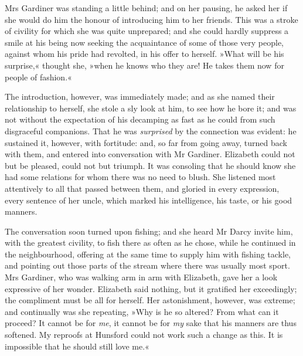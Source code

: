 Mrs Gardiner was standing a little behind; and on her pausing, he asked her if she would do him the honour of introducing him to her friends. This was a stroke of civility for which she was quite unprepared; and she could hardly suppress a smile at his being now seeking the acquaintance of some of those very people, against whom his pride had revolted, in his offer to herself. »What will be his surprise,« thought she, »when he knows who they are! He takes them now for people of fashion.«

The introduction, however, was immediately made; and as she named their relationship to herself, she stole a sly look at him, to see how he bore it; and was not without the expectation of his decamping as fast as he could from such disgraceful companions. That he was \textit{surprised} by the connection was evident: he sustained it, however, with fortitude: and, so far from going away, turned back with them, and entered into conversation with Mr Gardiner. Elizabeth could not but be pleased, could not but triumph. It was consoling that he should know she had some relations for whom there was no need to blush. She listened most attentively to all that passed between them, and gloried in every expression, every sentence of her uncle, which marked his intelligence, his taste, or his good manners.

The conversation soon turned upon fishing; and she heard Mr Darcy invite him, with the greatest civility, to fish there as often as he chose, while he continued in the neighbourhood, offering at the same time to supply him with fishing tackle, and pointing out those parts of the stream where there was usually most sport. Mrs Gardiner, who was walking arm in arm with Elizabeth, gave her a look expressive of her wonder. Elizabeth said nothing, but it gratified her exceedingly; the compliment must be all for herself. Her astonishment, however, was extreme; and continually was she repeating, »Why is he so altered? From what can it proceed? It cannot be for \textit{me}, it cannot be for \textit{my} sake that his manners are thus softened. My reproofs at Hunsford could not work such a change as this. It is impossible that he should still love me.«

